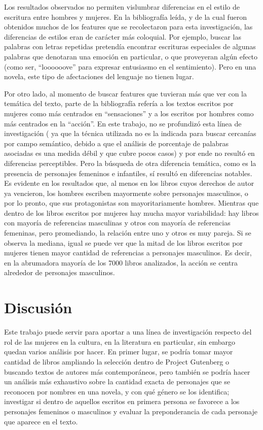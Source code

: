 \documentclass[
journal=jacsat, %
manuscript=article]{achemso}
\begin{document}
Los resultados observados no permiten vislumbrar diferencias en el estilo de escritura entre hombres y mujeres. En la bibliografía leída, y de la cual fueron obtenidos muchos de los features que se recolectaron para esta investigación, las diferencias de estilos eran de carácter más coloquial. Por ejemplo, buscar las palabras con letras repetidas pretendía encontrar escrituras especiales de algunas palabras que denotaran una emoción en particular, o que proveyeran algún efecto (como ser, “loooooove” para expresar entusiasmo en el sentimiento). Pero en una novela, este tipo de afectaciones del lenguaje no tienen lugar.

Por otro lado, al momento de buscar features que tuvieran más que ver con la temática del texto, parte de la bibliografía refería a los textos escritos por mujeres como más centrados en “sensaciones” y a los escritos por hombres como más centrados en la “acción”. En este trabajo, no se profundizó esta línea de investigación ( ya que la técnica utilizada no es la indicada para buscar cercanías por campo semántico, debido a que el análisis de porcentaje de palabras asociadas es una medida débil y que cubre pocos casos) y por ende no resultó en diferencias perceptibles. Pero la búsqueda de otra diferencia temática, como es la presencia de personajes femeninos e infantiles, sí resultó en diferencias notables.
Es evidente en los resultados que, al menos en los libros cuyos derechos de autor ya vencieron, los hombres escriben mayormente sobre personajes masculinos, o por lo pronto, que sus protagonistas son mayoritariamente hombres. Mientras que dentro de los libros escritos por mujeres hay mucha mayor variabilidad: hay libros con mayoría de referencias masculinas y otros con mayoría de referencias femeninas, pero promediando, la relación entre uno y otros es muy pareja. Si se observa la mediana, igual se puede ver que la mitad de los libros escritos por mujeres tienen mayor cantidad de referencias a personajes masculinos. Es decir, en la abrumadora mayoría de los 7000 libros analizados, la acción se centra alrededor de personajes masculinos.

\section{Discusión}

Este trabajo puede servir para aportar a una línea de investigación respecto del rol de las mujeres en la cultura, en la literatura en particular, sin embargo quedan varios análisis por hacer. En primer lugar, se podría tomar mayor cantidad de libros ampliando la selección dentro de Project Gutenberg o buscando textos de autores más contemporáneos, pero también se podría hacer un análisis más exhaustivo sobre la cantidad exacta de personajes que se reconocen por nombres en una novela, y con qué género se los identifica; investigar si dentro de aquellos escritos en primera persona se favorece a los personajes femeninos o masculinos y evaluar la preponderancia de cada personaje que aparece en el texto.
\end{document}
